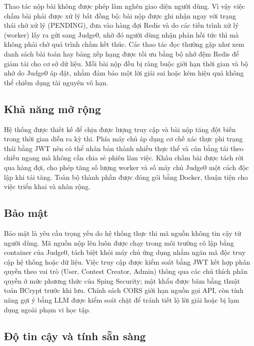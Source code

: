 \documentclass[12pt, a4paper]{report}
\begin{document}
Thao tác nộp bài không được phép làm nghẽn giao diện người dùng. Vì vậy việc chấm bài phải được xử lý
bất đồng bộ: bài nộp được ghi nhận ngay với trạng thái chờ xử lý (PENDING), đưa vào hàng đợi
Redis và do các tiến trình xử lý (worker) lấy ra gửi sang Judge0, nhờ đó người dùng nhận phản
hồi tức thì mà không phải chờ quá trình chấm kết thúc. Các thao tác đọc thường gặp như xem
danh sách bài toán hay bảng xếp hạng được tối ưu bằng bộ nhớ đệm Redis để giảm tải cho cơ sở
dữ liệu. Mỗi bài nộp đều bị ràng buộc giới hạn thời gian và bộ nhớ do Judge0 áp đặt, nhằm đảm bảo
một lời giải sai hoặc kém hiệu quả không thể chiếm dụng tài nguyên vô hạn.

\subsection{Khả năng mở rộng}

Hệ thống được thiết kế để chịu được lượng truy cập và bài nộp tăng đột biến trong thời gian
diễn ra kỳ thi. Phía máy chủ áp dụng cơ chế xác thực phi trạng thái bằng \ac{JWT} nên có thể
nhân bản thành nhiều thực thể và cân bằng tải theo chiều ngang mà không cần chia sẻ phiên làm
việc. Khâu chấm bài được tách rời qua hàng đợi, cho phép tăng số lượng worker và số máy chủ
Judge0 một cách độc lập khi tải tăng. Toàn bộ thành phần được đóng gói bằng Docker, thuận tiện
cho việc triển khai và nhân rộng.

\subsection{Bảo mật}

Bảo mật là yêu cầu trọng yếu do hệ thống thực thi mã nguồn không tin cậy từ người dùng. Mã nguồn nộp
lên luôn được chạy trong môi trường cô lập bằng container của Judge0, tách biệt khỏi máy chủ
ứng dụng nhằm ngăn mã độc truy cập hệ thống hoặc dữ liệu. Việc truy cập được kiểm soát bằng
\ac{JWT} kết hợp phân quyền theo vai trò (User, Contest Creator, Admin) thông qua các chú thích
phân quyền ở mức phương thức của Sping Security; mật khẩu được băm bằng thuật toán BCrypt trước khi lưu. Chính
sách \ac{CORS} giới hạn nguồn gọi \ac{API}, còn tính năng gợi ý bằng \ac{LLM}
được kiểm soát chặt để tránh tiết lộ lời giải hoặc bị lạm dụng ngoài phạm vi học tập.

\subsection{Độ tin cậy và tính sẵn sàng}
\end{document}
